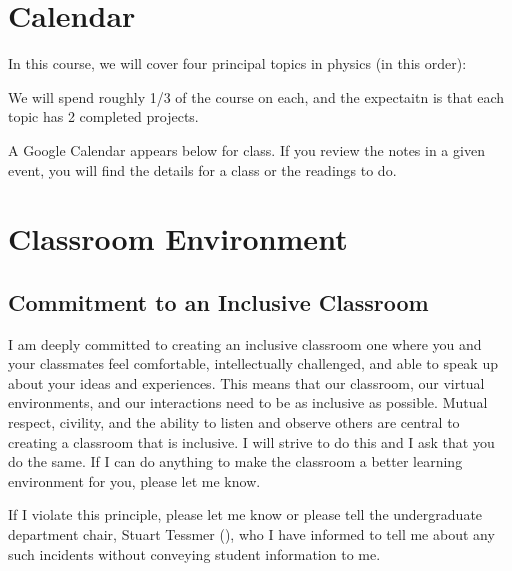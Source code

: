 \documentclass[letterpaper,10pt,english]{jupyterBook}
\begin{document}
\sphinxstepscope


\section{Calendar}
\label{\detokenize{content/0_course/calendar:calendar}}\label{\detokenize{content/0_course/calendar::doc}}
\sphinxAtStartPar
In this course, we will cover four principal topics in physics (in this order):

\sphinxAtStartPar
We will spend roughly 1/3 of the course on each, and the expectaitn is that each topic has 2 completed projects.

\sphinxAtStartPar
A Google Calendar appears below for class. If you review the notes in a given event, you will find the details for a class or the readings to do.

\sphinxstepscope


\section{Classroom Environment}
\label{\detokenize{content/0_course/environment:classroom-environment}}\label{\detokenize{content/0_course/environment::doc}}

\subsection{Commitment to an Inclusive Classroom}
\label{\detokenize{content/0_course/environment:commitment-to-an-inclusive-classroom}}
\sphinxAtStartPar
I am deeply committed to creating an inclusive classroom \sphinxhyphen{} one where you and your classmates
feel comfortable, intellectually challenged, and able to speak up about your ideas
and experiences. This means that our classroom, our virtual environments, and our interactions
need to be as inclusive as possible. Mutual respect, civility, and the ability to listen
and observe others are central to creating a classroom that is inclusive. I will strive to
do this and I ask that you do the same. If I can do anything to make the classroom a better
learning environment for you, please let me know.

\sphinxAtStartPar
{}

\sphinxAtStartPar
If I violate this principle, please let me know or please tell the undergraduate department chair, Stuart Tessmer (), who I have informed to tell me about any such incidents without conveying student information to me.
\end{document}
